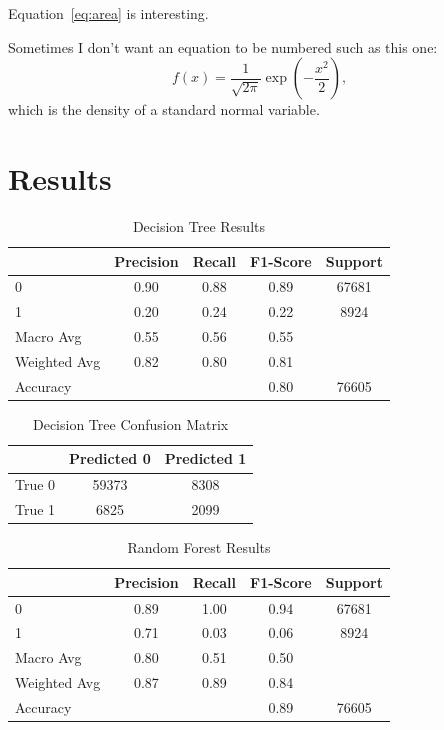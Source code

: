 \documentclass[12pt]{article}
\begin{document}
Equation~\eqref{eq:area} is interesting. \lipsum[1-4]

Sometimes I don't want an equation to be numbered such as this one:
\[
  f(x) = \frac{1}{\sqrt{2\pi}} \exp\left( - \frac{x^2}{2} \right),
\]
which is the density of a standard normal variable.



\section{Results}
\label{sec:resu}

\lipsum[1]

\begin{table}[htbp]
    \centering
    \caption{Decision Tree Results}
    \begin{tabular}{lcccc}
        \toprule
        & Precision & Recall & F1-Score & Support \\
        \midrule
        0 & 0.90 & 0.88 & 0.89 & 67681 \\
        1 & 0.20 & 0.24 & 0.22 & 8924 \\
        Macro Avg & 0.55 & 0.56 & 0.55 & \\
        Weighted Avg & 0.82 & 0.80 & 0.81 & \\
        \midrule
        Accuracy & & & 0.80 & 76605 \\
        \bottomrule
    \end{tabular}
\end{table}

\begin{table}[htbp]
    \centering
    \caption{Decision Tree Confusion Matrix}
    \begin{tabular}{lcc}
        \toprule
        & Predicted 0 & Predicted 1 \\
        \midrule
        True 0 & 59373 & 8308 \\
        True 1 & 6825 & 2099 \\
        \bottomrule
    \end{tabular}
\end{table}

\begin{table}[htbp]
    \centering
    \caption{Random Forest Results}
    \begin{tabular}{lcccc}
        \toprule
        & Precision & Recall & F1-Score & Support \\
        \midrule
        0 & 0.89 & 1.00 & 0.94 & 67681 \\
        1 & 0.71 & 0.03 & 0.06 & 8924 \\
        Macro Avg & 0.80 & 0.51 & 0.50 & \\
        Weighted Avg & 0.87 & 0.89 & 0.84 & \\
        \midrule
        Accuracy & & & 0.89 & 76605 \\
        \bottomrule
    \end{tabular}
\end{table}
\end{document}
